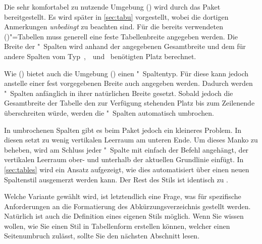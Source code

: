 \documentclass[%
  english,ngerman,%
  cdgeometry=no,DIV=12,automark%
]{tudscrartcl}
\begin{document}
Die sehr komfortabel zu nutzende Umgebung () 
wird durch das Paket  bereitgestellt. Es wird später in 
\autoref{sec:tabu} vorgestellt, wobei die dortigen Anmerkungen \emph{unbedingt} 
zu beachten sind. Für die bereits verwendeten 
()"=Tabellen muss generell eine feste 
Tabellenbreite angegeben werden. Die Breite der "~Spalten wird anhand 
der angegebenen Gesamtbreite und dem für andere Spalten vom 
Typ~,~~und~ benötigten Platz berechnet. 

Wie () bietet auch die Umgebung 
() einen "~Spaltentyp. Für diese kann 
jedoch anstelle einer fest vorgegebenen Breite auch  
angegeben werden. Dadurch werden "~Spalten anfänglich in ihrer 
natürlichen Breite gesetzt. Sobald jedoch die Gesamtbreite der Tabelle den zur 
Verfügung stehenden Platz bis zum Zeilenende überschreiten würde, werden die 
"~Spalten automatisch umbrochen. 

In umbrochenen Spalten gibt es beim Paket  jedoch ein kleineres 
Problem. In diesen setzt  zu wenig vertikalen Leerraum am unteren 
Ende. Um dieses Manko zu beheben, wird am Schluss jeder "~Spalte mit 
 einfach der Befehl  
angehängt, der vertikalen Leerraum ober- und unterhalb der aktuellen Grundlinie 
einfügt. In \autoref{sec:tables} wird ein Ansatz aufgezeigt, wie dies 
automatisiert über einen neuen Spaltenstil ausgemerzt werden kann. Der Rest des 
Stils ist identisch zu .
%
\CodeHook{\let\newglossarystyle\renewglossarystyle}
\begin{Preamble*}

\end{Preamble*}
\begin{Hint}
\printacronyms[style=acrotabu]
\end{Hint}
\begin{quoting}[rightmargin=0pt]
\glsdisablehyper
\InputCode
\end{quoting}
%
Welche Variante gewählt wird, ist letztendlich eine Frage, was für spezifische 
Anforderungen an die Formatierung des Abkürzungsverzeichnis gestellt werden. 
Natürlich ist auch die Definition eines eigenen Stils möglich. Wenn Sie wissen 
wollen, wie Sie einen Stil in Tabellenform erstellen können, welcher einen 
Seitenumbruch zulässt, sollte Sie den nächsten Abschnitt lesen.
\end{document}
